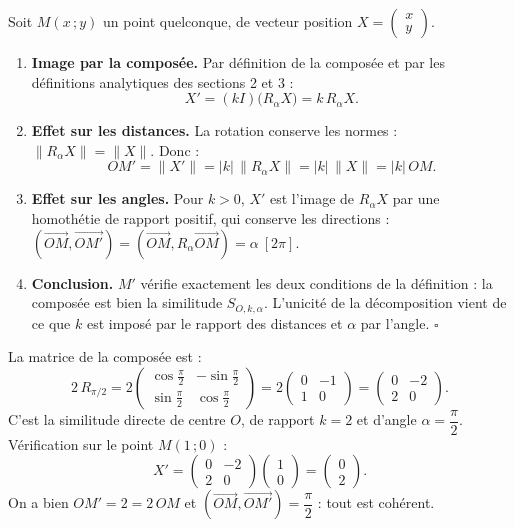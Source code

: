 \documentclass[11pt]{article}
\begin{document}
\begin{experience}
Soit $M(x\,;y)$ un point quelconque, de vecteur position $X = \begin{pmatrix} x \\ y \end{pmatrix}$.
\begin{enumerate}
\item \textbf{Image par la composée.} Par définition de la composée et par les définitions analytiques des sections 2 et 3 :
\[
X' = (kI)\big(R_\alpha X\big) = k\,R_\alpha X.
\]
\item \textbf{Effet sur les distances.} La rotation conserve les normes : $\|R_\alpha X\| = \|X\|$. Donc :
\[
OM' = \|X'\| = |k|\,\|R_\alpha X\| = |k|\,\|X\| = |k|\,OM.
\]
\item \textbf{Effet sur les angles.} Pour $k > 0$, $X'$ est l'image de $R_\alpha X$ par une homothétie de rapport positif, qui conserve les directions : $(\overrightarrow{OM},\overrightarrow{OM'}) = (\overrightarrow{OM}, R_\alpha\overrightarrow{OM}) = \alpha \ [2\pi]$.
\item \textbf{Conclusion.} $M'$ vérifie exactement les deux conditions de la définition : la composée est bien la similitude $S_{O,k,\alpha}$. L'unicité de la décomposition vient de ce que $k$ est imposé par le rapport des distances et $\alpha$ par l'angle. $\square$
\end{enumerate}
\end{experience}

\begin{exemplebox}
La matrice de la composée est :
\[
2\,R_{\pi/2} = 2\begin{pmatrix} \cos\frac{\pi}{2} & -\sin\frac{\pi}{2} \\ \sin\frac{\pi}{2} & \cos\frac{\pi}{2} \end{pmatrix} = 2\begin{pmatrix} 0 & -1 \\ 1 & 0 \end{pmatrix} = \begin{pmatrix} 0 & -2 \\ 2 & 0 \end{pmatrix}.
\]
C'est la similitude directe de centre $O$, de rapport $k = 2$ et d'angle $\alpha = \dfrac{\pi}{2}$. Vérification sur le point $M(1\,;0)$ :
\[
X' = \begin{pmatrix} 0 & -2 \\ 2 & 0 \end{pmatrix}\begin{pmatrix} 1 \\ 0 \end{pmatrix} = \begin{pmatrix} 0 \\ 2 \end{pmatrix}.
\]
On a bien $OM' = 2 = 2\,OM$ et $(\overrightarrow{OM},\overrightarrow{OM'}) = \dfrac{\pi}{2}$ : tout est cohérent.
\end{exemplebox}
\end{document}
